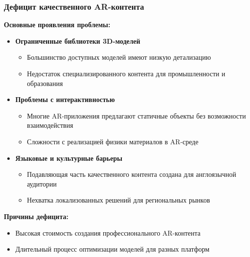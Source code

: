 \subsubsection{Дефицит качественного AR-контента}
\textbf{Основные проявления проблемы:}
\begin{itemize}
    \item \textbf{Ограниченные библиотеки 3D-моделей}
    \begin{itemize}
        \item Большинство доступных моделей имеют низкую детализацию
        \item Недостаток специализированного контента для промышленности и образования
    \end{itemize}
    
    \item \textbf{Проблемы с интерактивностью}
    \begin{itemize}
        \item Многие AR-приложения предлагают статичные объекты без возможности взаимодействия
        \item Сложности с реализацией физики материалов в AR-среде
    \end{itemize}
    
    \item \textbf{Языковые и культурные барьеры}
    \begin{itemize}
        \item Подавляющая часть качественного контента создана для англоязычной аудитории
        \item Нехватка локализованных решений для региональных рынков
    \end{itemize}
\end{itemize}

\textbf{Причины дефицита:}
\begin{itemize}
    \item Высокая стоимость создания профессионального AR-контента
    \item Длительный процесс оптимизации моделей для разных платформ
\end{itemize}

